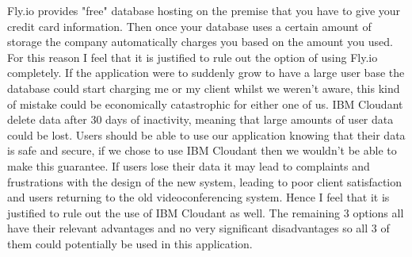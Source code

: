 Fly.io provides "free" database hosting on the premise that
you have to give your credit card information. Then once 
your database uses a certain amount of storage the company
automatically charges you based on the amount you used. For
this reason I feel that it is justified to rule out the
option of using Fly.io completely. If the application were
to suddenly grow to have a large user base the database could
start charging me or my client whilst we weren't aware, this
kind of mistake could be economically catastrophic for either 
one of us. IBM Cloudant delete data after 30 days of 
inactivity, meaning that large amounts of user data could 
be lost. Users should be able to use our application knowing
that their data is safe and secure, if we chose to use IBM
Cloudant then we wouldn't be able to make this guarantee. If
users lose their data it may lead to complaints and 
frustrations with the design of the new system, leading to 
poor client satisfaction and users returning to the old 
videoconferencing system. Hence I feel that it is justified 
to rule out the use of IBM Cloudant as well. The remaining 3 
options all have their relevant advantages and no very
significant disadvantages so all 3 of them could potentially
be used in this application. \\ \vspace{0.2cm}

